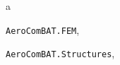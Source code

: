 \documentclass[letterpaper,10pt,english]{sphinxmanual}
\begin{document}
\renewcommand{\indexname}{Python Module Index}
\begin{theindex}
\def\bigletter#1{{\Large\sffamily#1}\nopagebreak\vspace{1mm}}
\bigletter{a}
\item {\texttt{AeroComBAT.FEM}}, \pageref{FEM:module-AeroComBAT.FEM}
\item {\texttt{AeroComBAT.Structures}}, \pageref{structures:module-AeroComBAT.Structures}
\end{theindex}

\renewcommand{\indexname}{Index}
\printindex
\end{document}
